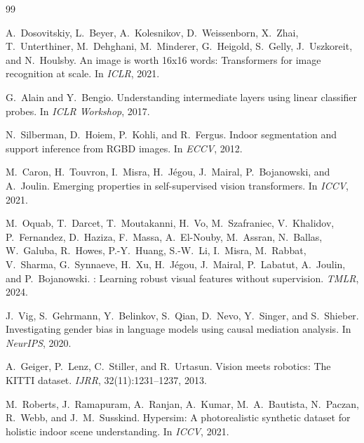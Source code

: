 \documentclass[11pt,a4paper]{article}
\begin{document}
\begin{thebibliography}{99}

A.~Dosovitskiy, L.~Beyer, A.~Kolesnikov, D.~Weissenborn, X.~Zhai,
T.~Unterthiner, M.~Dehghani, M.~Minderer, G.~Heigold, S.~Gelly, J.~Uszkoreit,
and N.~Houlsby.
\newblock An image is worth 16x16 words: Transformers for image recognition at
  scale.
\newblock In \emph{ICLR}, 2021.

G.~Alain and Y.~Bengio.
\newblock Understanding intermediate layers using linear classifier probes.
\newblock In \emph{ICLR Workshop}, 2017.

N.~Silberman, D.~Hoiem, P.~Kohli, and R.~Fergus.
\newblock Indoor segmentation and support inference from {RGBD} images.
\newblock In \emph{ECCV}, 2012.

M.~Caron, H.~Touvron, I.~Misra, H.~Jégou, J.~Mairal, P.~Bojanowski, and
A.~Joulin.
\newblock Emerging properties in self-supervised vision transformers.
\newblock In \emph{ICCV}, 2021.

M.~Oquab, T.~Darcet, T.~Moutakanni, H.~Vo, M.~Szafraniec, V.~Khalidov,
P.~Fernandez, D.~Haziza, F.~Massa, A.~El-Nouby, M.~Assran, N.~Ballas,
W.~Galuba, R.~Howes, P.-Y.~Huang, S.-W.~Li, I.~Misra, M.~Rabbat, V.~Sharma,
G.~Synnaeve, H.~Xu, H.~Jégou, J.~Mairal, P.~Labatut, A.~Joulin, and
P.~Bojanowski.
: Learning robust visual features without supervision.
\newblock \emph{TMLR}, 2024.

J.~Vig, S.~Gehrmann, Y.~Belinkov, S.~Qian, D.~Nevo, Y.~Singer, and
S.~Shieber.
\newblock Investigating gender bias in language models using causal mediation
  analysis.
\newblock In \emph{NeurIPS}, 2020.

A.~Geiger, P.~Lenz, C.~Stiller, and R.~Urtasun.
\newblock Vision meets robotics: The {KITTI} dataset.
\newblock \emph{IJRR}, 32(11):1231--1237, 2013.

M.~Roberts, J.~Ramapuram, A.~Ranjan, A.~Kumar, M.~A.~Bautista,
N.~Paczan, R.~Webb, and J.~M.~Susskind.
\newblock Hypersim: A photorealistic synthetic dataset for holistic indoor
  scene understanding.
\newblock In \emph{ICCV}, 2021.

\end{thebibliography}
\end{document}

